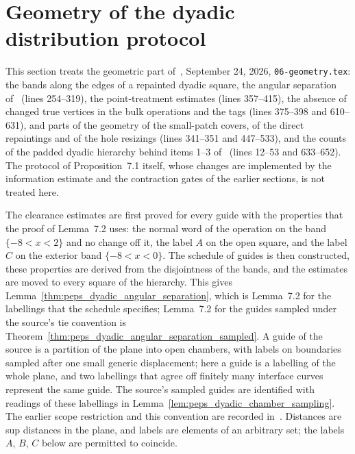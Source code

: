 \section{Geometry of the dyadic distribution protocol}
\label{sec:peps_dyadic_geometry}
This section treats the geometric part of~\cite[Section~7]{OpenAI2026PolynomialPEPS},
September 24, 2026, \texttt{06-geometry.tex}: the bands along the edges of a
repainted dyadic square, the angular separation of~\cite[Lemma~7.2]{OpenAI2026PolynomialPEPS}
(lines 254--319), the point-treatment estimates (lines 357--415), the absence of
changed true vertices in the bulk operations and the tags (lines 375--398 and
610--631), and parts of the geometry of the small-patch covers, of the direct
repaintings and of the hole resizings (lines 341--351 and 447--533), and the counts of the padded
dyadic hierarchy behind items 1--3
of~\cite[Proposition~7.1]{OpenAI2026PolynomialPEPS} (lines 12--53 and 633--652).
The protocol of Proposition~7.1 itself, whose changes are implemented by the
information estimate and the contraction gates of the earlier sections, is not
treated here.

The clearance estimates are first proved for every guide with the properties that
the proof of Lemma~7.2 uses: the normal word of the operation on the band
$\{-8<x<2\}$ and no change off it, the label $A$ on the open square, and the label
$C$ on the exterior band $\{-8<x<0\}$. The schedule of guides is then constructed,
these properties are derived from the disjointness of the bands, and the estimates
are moved to every square of the hierarchy. This gives
Lemma~\ref{thm:peps_dyadic_angular_separation}, which is Lemma~7.2 for the
labellings that the schedule specifies; Lemma~7.2 for the guides sampled under the
source's tie convention is Theorem~\ref{thm:peps_dyadic_angular_separation_sampled}. A guide of the
source is a partition of the plane into open chambers, with labels on boundaries
sampled after one small generic displacement; here a guide is a labelling of the
whole plane, and two labellings that agree off finitely many interface curves
represent the same guide. The source's sampled guides are identified with readings
of these labellings in Lemma~\ref{lem:peps_dyadic_chamber_sampling}. The earlier scope
restriction and this convention are recorded
in~\cite{gap:openai26_dyadic_geometry_guide_properties}. Distances are sup
distances in the plane, and labels are elements of an arbitrary set; the labels
$A$, $B$, $C$ below are permitted to coincide.

